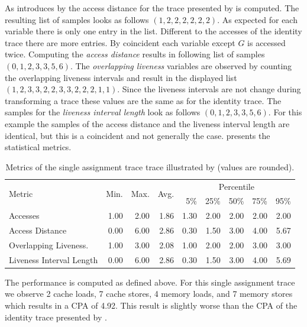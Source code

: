 \documentclass[onecolumn, openright, master, english, signatures]{dbrgrptt}
\begin{document}
As introduces by  the access distance for the \ac{trace} presented by  is computed. The resulting list of samples looks as follows $(1, 2, 2, 2, 2, 2, 2)$. As expected for each variable there is only one entry in the list. Different to the accesses of the identity \ac{trace} there are more entries. By coincident each variable except $G$ is accessed twice. Computing the \emph{access distance} results in following list of samples $(0, 1, 2, 3, 3, 5, 6)$. The \emph{overlapping liveness} variables are observed by counting the overlapping liveness intervals and result in the displayed list $(1, 2, 3, 3, 2, 2, 3, 3, 2, 2, 2, 1, 1)$. Since the liveness intervals are not change during transforming a \ac{trace} these values are the same as for the identity \ac{trace}. The samples for the \emph{liveness interval length} look as follows $(0, 1, 2, 3, 3, 5, 6)$. For this example the samples of the access distance and the liveness interval length are identical, but this is a coincident and not generally the case.  presents the statistical metrics.

\begin{table}[!ht]
  \centering
  \begin{tabular}{lrrrrrrrr}
    \hline
    \multirow{2}{*}{Metric} & \multirow{2}{*}{Min.} & \multirow{2}{*}{Max.} & \multirow{2}{*}{Avg.} & \multicolumn{5}{c}{Percentile} \tabularnewline
    & & & & 5\% & 25\% & 50\% & 75\% & 95\% \tabularnewline
    \hline
    Accesses                 & 1.00 & 2.00 & 1.86 & 1.30 & 2.00 & 2.00 & 2.00 & 2.00 \\
    Access Distance          & 0.00 & 6.00 & 2.86 & 0.30 & 1.50 & 3.00 & 4.00 & 5.67 \\
    Overlapping Liveness.    & 1.00 & 3.00 & 2.08 & 1.00 & 2.00 & 2.00 & 3.00 & 3.00 \\
    Liveness Interval Length & 0.00 & 6.00 & 2.86 & 0.30 & 1.50 & 3.00 & 4.00 & 5.69 \\
    \hline
  \end{tabular}
  \caption{Metrics of the single assignment trace \ac{trace} illustrated by  (values are rounded).}
  \label{tab:summarizing-example-metrics-sa}
\end{table}

The performance is computed as defined above. For this single assignment trace we observe 2 cache loads, 7 cache stores, 4 memory loads, and 7 memory stores which results in a \ac{CPA} of 4.92. This result is slightly worse than the \ac{CPA} of the identity \ac{trace} presented by .
\end{document}
